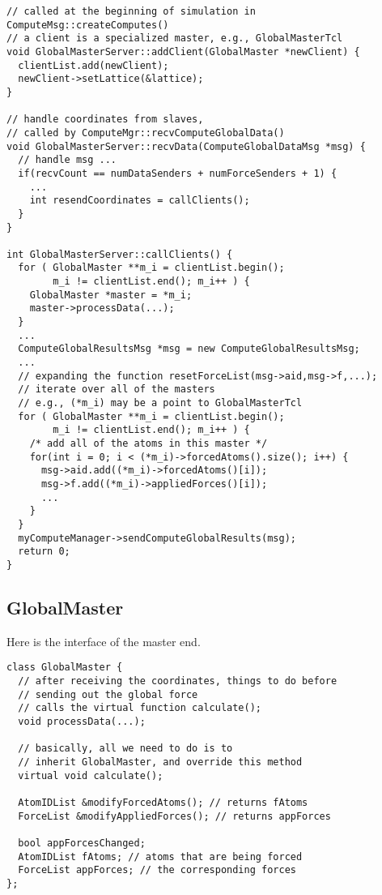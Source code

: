 \documentclass{article}
\begin{document}
\begin{lstlisting}
// called at the beginning of simulation in ComputeMsg::createComputes()
// a client is a specialized master, e.g., GlobalMasterTcl
void GlobalMasterServer::addClient(GlobalMaster *newClient) {
  clientList.add(newClient);
  newClient->setLattice(&lattice);
}

// handle coordinates from slaves,
// called by ComputeMgr::recvComputeGlobalData()
void GlobalMasterServer::recvData(ComputeGlobalDataMsg *msg) {
  // handle msg ...
  if(recvCount == numDataSenders + numForceSenders + 1) {
    ...
    int resendCoordinates = callClients();
  }
}

int GlobalMasterServer::callClients() {
  for ( GlobalMaster **m_i = clientList.begin();
        m_i != clientList.end(); m_i++ ) {
    GlobalMaster *master = *m_i;
    master->processData(...);
  }
  ...
  ComputeGlobalResultsMsg *msg = new ComputeGlobalResultsMsg;
  ...
  // expanding the function resetForceList(msg->aid,msg->f,...);
  // iterate over all of the masters
  // e.g., (*m_i) may be a point to GlobalMasterTcl
  for ( GlobalMaster **m_i = clientList.begin();
        m_i != clientList.end(); m_i++ ) {
    /* add all of the atoms in this master */
    for(int i = 0; i < (*m_i)->forcedAtoms().size(); i++) {
      msg->aid.add((*m_i)->forcedAtoms()[i]);
      msg->f.add((*m_i)->appliedForces()[i]);
      ...
    }
  }
  myComputeManager->sendComputeGlobalResults(msg);
  return 0;
}
\end{lstlisting}


\subsection{GlobalMaster}

Here is the interface of the master end.
\begin{lstlisting}
class GlobalMaster {
  // after receiving the coordinates, things to do before
  // sending out the global force
  // calls the virtual function calculate();
  void processData(...);

  // basically, all we need to do is to
  // inherit GlobalMaster, and override this method
  virtual void calculate();

  AtomIDList &modifyForcedAtoms(); // returns fAtoms
  ForceList &modifyAppliedForces(); // returns appForces

  bool appForcesChanged;
  AtomIDList fAtoms; // atoms that are being forced
  ForceList appForces; // the corresponding forces
};
\end{lstlisting}
\end{document}
